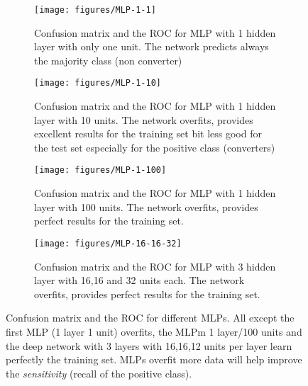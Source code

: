 \documentclass[11pt]{article}
\begin{document}
\begin{figure}[h]
    \centering
    \begin{subfigure}[t]{1\textwidth}
        \centering
        \texttt{[image: figures/MLP-1-1]}
        \caption{Confusion matrix and the ROC for MLP with 1 hidden layer with only one unit. The network predicts always the majority class (non converter)}
    \end{subfigure}

    \begin{subfigure}[t]{1\textwidth}
        \centering
        \texttt{[image: figures/MLP-1-10]}
        \caption{Confusion matrix and the ROC for MLP with 1 hidden layer with 10 units. The network overfits, provides excellent results for the training set bit less good for the test set especially for the positive class (converters)}
    \end{subfigure}%

    \begin{subfigure}[t]{1\textwidth}
        \centering
        \texttt{[image: figures/MLP-1-100]}
        \caption{Confusion matrix and the ROC for MLP with 1 hidden layer with 100 units. The network overfits, provides perfect results for the training set.}
    \end{subfigure}%

    \begin{subfigure}[t]{1\textwidth}
        \centering
        \texttt{[image: figures/MLP-16-16-32]}
        \caption{Confusion matrix and the ROC for MLP with 3 hidden layer with 16,16 and 32 units each. The network overfits, provides perfect results for the training set.}
    \end{subfigure}%
    \label{fig:mlp_cm}
    \caption{Confusion matrix and the ROC for different MLPs. All except the first MLP (1 layer 1 unit) overfits, the MLPm 1 layer/100 units and the deep network with 3 layers with 16,16,12 units per layer learn perfectly the training set. MLPs overfit more data will help improve the \emph{sensitivity} (recall of the positive class).}
\end{figure}
\end{document}
